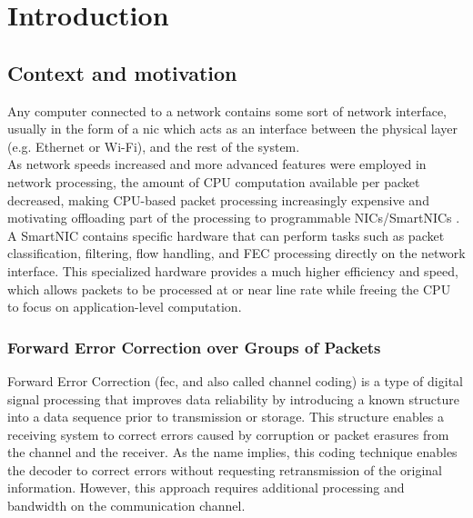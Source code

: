 \chapter{Introduction}\label{ch:introduction}

\section{Context and motivation}

Any computer connected to a network contains some sort of network interface, usually in the form 
of a \gls{nic} which acts as an interface between the physical layer (e.g. Ethernet or Wi-Fi), 
and the rest of the system. \\

As network speeds increased and more advanced features were employed in network processing, the amount of CPU computation 
available per packet decreased, making CPU-based packet processing increasingly expensive and motivating offloading 
part of the processing to programmable NICs/SmartNICs \cite{wang2022fpgAnic} \cite{kim2023iotcp}.\\

A SmartNIC contains specific hardware that can perform tasks such as packet classification, filtering, flow handling, 
and FEC processing directly on the network interface. This specialized hardware provides a much higher efficiency and speed,
which allows packets to be processed at or near line rate while freeing the CPU to focus on application-level computation.

\subsection{Forward Error Correction over Groups of Packets}
\label{subsec:fec-generations}

Forward Error Correction (\gls{fec}, and also called channel coding) is a type of digital signal processing that improves data reliability 
by introducing a known structure into a data sequence prior to transmission or storage. This structure enables a receiving system 
to correct errors caused by corruption or packet erasures from the channel and the receiver. As the name implies, this coding technique 
enables the decoder to correct errors without requesting retransmission of the original information. However, this approach requires 
additional processing and bandwidth on the communication channel.\\


